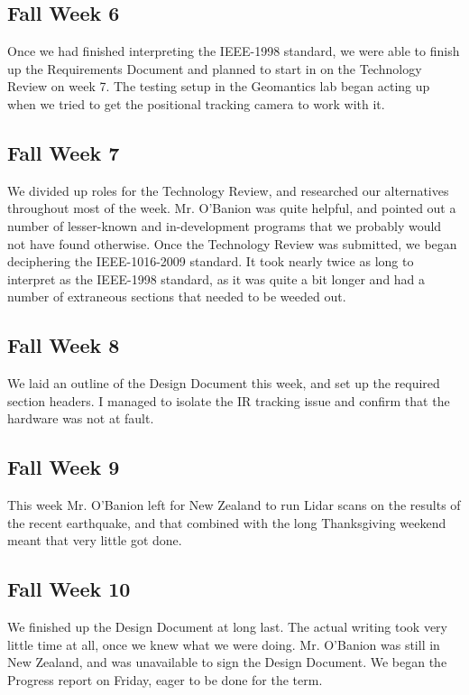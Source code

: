\documentclass{article}
\begin{document}
\subsection{Fall Week 6}

Once we had finished interpreting the IEEE-1998 standard, we were able to finish up the Requirements Document and planned to start in on the Technology Review on week 7. 
The testing setup in the Geomantics lab began acting up when we tried to get the positional tracking camera to work with it.

\subsection{Fall Week 7}

We divided up roles for the Technology Review, and researched our alternatives throughout most of the week. 
Mr. O'Banion was quite helpful, and pointed out a number of lesser-known and in-development programs that we probably would not have found otherwise. 
Once the Technology Review was submitted, we began deciphering the IEEE-1016-2009 standard. 
It took nearly twice as long to interpret as the IEEE-1998 standard, as it was quite a bit longer and had a number of extraneous sections that needed to be weeded out. 

\subsection{Fall Week 8}

We laid an outline of the Design Document this week, and set up the required section headers. 
I managed to isolate the IR tracking issue and confirm that the hardware was not at fault.

\subsection{Fall Week 9}

This week Mr. O'Banion left for New Zealand to run Lidar scans on the results of the recent earthquake, and that combined with the long Thanksgiving weekend meant that very little got done.

\subsection{Fall Week 10}

We finished up the Design Document at long last. The actual writing took very little time at all, once we knew what we were doing. 
Mr. O'Banion was still in New Zealand, and was unavailable to sign the Design Document. 
We began the Progress report on Friday, eager to be done for the term.
\end{document}
